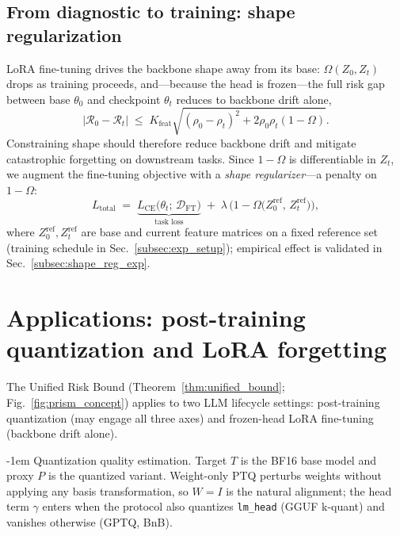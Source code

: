 \documentclass{article}
\makeatletter
\newlength{\paraSpace}
\renewcommand{\paragraph}{\@startsection{paragraph}{4}{\z@}%
  {\paraSpace}{-1em}%
  {\normalfont\normalsize\bfseries}}
\makeatother
\begin{document}
\subsection{From diagnostic to training: shape regularization}
\label{subsec:shape_reg}

LoRA fine-tuning drives the backbone shape away from its base: $\Omega(Z_0, Z_t)$ drops as training proceeds, and---because the head is frozen---the full risk gap between base $\theta_0$ and checkpoint $\theta_t$ reduces to backbone drift alone,
\begin{equation}
\label{eq:lora_bound}
|\mathcal{R}_0 - \mathcal{R}_t| \;\le\; K_{\mathrm{feat}}\sqrt{(\rho_0-\rho_t)^2 + 2\rho_0\rho_t(1-\Omega)}.
\end{equation}
Constraining shape should therefore reduce backbone drift and mitigate catastrophic forgetting on downstream tasks. Since $1 - \Omega$ is differentiable in $Z_t$, we augment the fine-tuning objective with a \emph{shape regularizer}---a penalty on $1-\Omega$:
\begin{equation}
\label{eq:shape_reg}
L_{\mathrm{total}} \;=\; \underbrace{L_{\mathrm{CE}}\bigl(\theta_t;\,\mathcal{D}_{\mathrm{FT}}\bigr)}_{\text{task loss}} \;+\; \lambda\,\bigl(1 - \Omega\!\bigl(Z_0^{\text{ref}},\, Z_t^{\text{ref}}\bigr)\bigr),
\end{equation}
where $Z_0^{\text{ref}}, Z_t^{\text{ref}}$ are base and current feature matrices on a fixed reference set (training schedule in Sec.~\ref{subsec:exp_setup}); empirical effect is validated in Sec.~\ref{subsec:shape_reg_exp}.


\section{Applications: post-training quantization and LoRA forgetting}
\label{sec:applications}

The Unified Risk Bound (Theorem~\ref{thm:unified_bound}; Fig.~\ref{fig:prism_concept}) applies to two LLM lifecycle settings: post-training quantization (may engage all three axes) and frozen-head LoRA fine-tuning (backbone drift alone).

\paragraph{Quantization quality estimation.}
\label{subsec:quantization}
Target $T$ is the BF16 base model and proxy $P$ is the quantized variant. Weight-only PTQ perturbs weights without applying any basis transformation, so $W{=}I$ is the natural alignment; the head term $\gamma$ enters when the protocol also quantizes \texttt{lm\_head} (GGUF k-quant) and vanishes otherwise (GPTQ, BnB).
\end{document}
